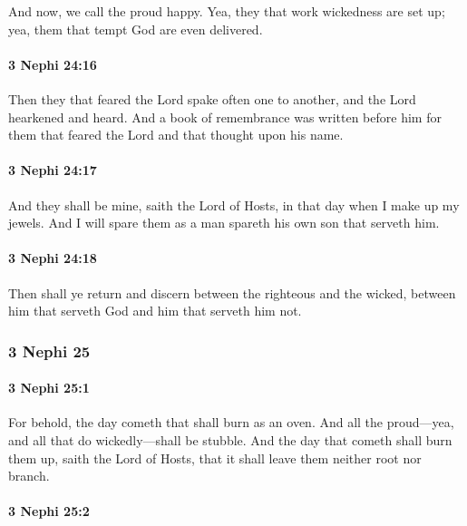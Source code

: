			And now, we call the proud happy.
			Yea, they that work wickedness are set up;
			yea, them that tempt God are even delivered.

		\paragraph{3 Nephi 24:16} %
			\label{3NEPHI-24-16}

			Then they that feared the Lord spake often one to another,
			and the Lord hearkened and heard.
			And a book of remembrance was written before him
			for them that feared the Lord
			and that thought upon his name.

		\paragraph{3 Nephi 24:17} %
			\label{3NEPHI-24-17}

			And they shall be mine, saith the Lord of Hosts,
			in that day when I make up my jewels.
			And I will spare them as a man spareth his own son that serveth him.

		\paragraph{3 Nephi 24:18} %
			\label{3NEPHI-24-18}

			Then shall ye return and discern between the righteous and the wicked,
			between him that serveth God and him that serveth him not.

	\subsubsection{3 Nephi 25} %
		\label{3NEPHI-25}
		
		\paragraph{3 Nephi 25:1} %
			\label{3NEPHI-25-1}

			For behold, the day cometh that shall burn as an oven.
			And all the proud---yea, and all that do wickedly---shall be stubble.
			And the day that cometh shall burn them up, saith the Lord of Hosts,
			that it shall leave them neither root nor branch.

		\paragraph{3 Nephi 25:2} %
			\label{3NEPHI-25-2}

